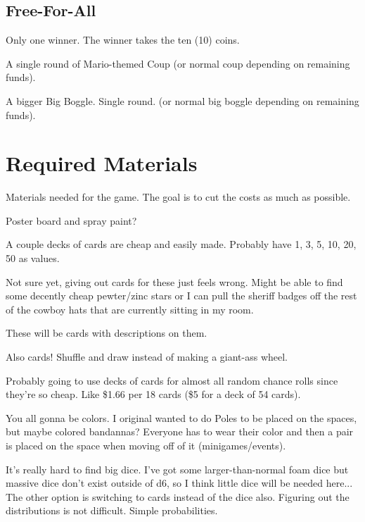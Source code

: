 \documentclass{article}
\begin{document}
\subsection{Free-For-All}

Only one winner.  The winner takes the ten (10) coins.

\begin{description}[style=nextline]
\item[Coup] A single round of Mario-themed Coup (or normal coup depending on remaining funds).
\item[Boggled] A bigger Big Boggle.  Single round. (or normal big boggle depending on remaining funds).
\item[...]
\end{description}

\section{Required Materials}

Materials needed for the game.  The goal is to cut the costs as much as possible.

\begin{description}[style=nextline]
\item[Board Spaces] Poster board and spray paint?

\item[Coins] A couple decks of cards are cheap and easily made.
Probably have 1, 3, 5, 10, 20, 50 as values.

\item[Stars] Not sure yet, giving out cards for these just feels wrong. Might be able to find
some decently cheap pewter/zinc stars or I can pull the sheriff badges off the rest of the
cowboy hats that are currently sitting in my room.

\item[Items] These will be cards with descriptions on them.

\item[Minigames] Also cards! Shuffle and draw instead of making a giant-ass wheel.

\item[Other Random Stuff] Probably going to use decks of cards for almost all random
chance rolls since they're so cheap.  Like \$1.66 per 18 cards (\$5 for a deck of 54 cards).

\item[Player Designation] You all gonna be colors.  I original wanted to do Poles to be placed on the spaces,
but maybe colored bandannas?  Everyone has to wear their color and then a pair is placed on the space when
moving off of it (minigames/events).

\item[Dice] It's really hard to find big dice.  I've got some larger-than-normal foam dice but massive
dice don't exist outside of d6, so I think little dice will be needed here... The other option is switching
to cards instead of the dice also.  Figuring out the distributions is not difficult.  Simple probabilities.
\end{description}
\end{document}
